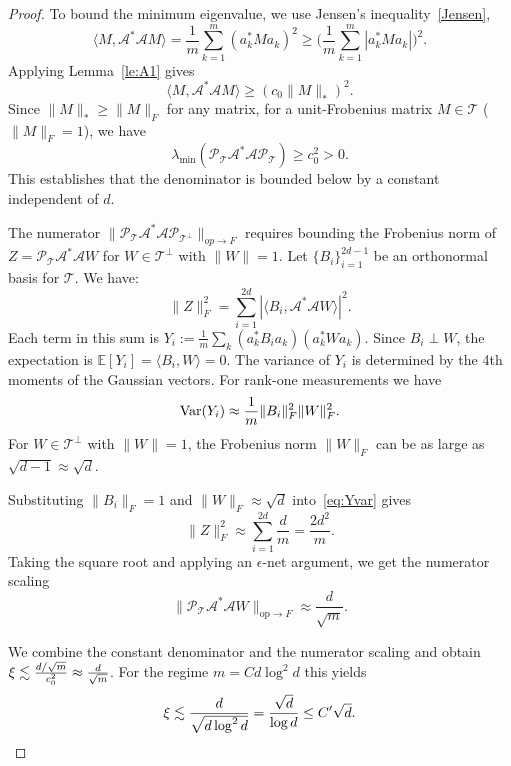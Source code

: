 \begin{proof}
To bound the minimum eigenvalue, we use Jensen's inequality~\eqref{Jensen},
$$\langle M, \mathcal{A}^* \mathcal{A} M \rangle = \frac{1}{m} \sum_{k=1}^m (a_k^* M a_k)^2 \ge \Big( \frac{1}{m} \sum_{k=1}^m |a_k^* M a_k| \Big)^2.$$
Applying Lemma~\ref{le:A1} gives
$$\langle M, \mathcal{A}^* \mathcal{A} M \rangle \ge (c_0 \|M\|_*)^2.$$
Since $\|M\|_* \ge \|M\|_F$ for any matrix, for a unit-Frobenius matrix $M \in \mathcal{T}$ ($\|M\|_F=1$), we have
$$\lambda_{\min}(\mathcal{P}_{\mathcal{T}} \mathcal{A}^* \mathcal{A} \mathcal{P}_{\mathcal{T}}) \ge c_0^2 > 0.$$
This establishes that the denominator is bounded below by a constant independent of $d$.


The numerator $\|\mathcal{P}_{\mathcal{T}} \mathcal{A}^* \mathcal{A} \mathcal{P}_{\mathcal{T}^\perp} \|_{op \to F}$ requires bounding the Frobenius norm of $Z = \mathcal{P}_{\mathcal{T}} \mathcal{A}^* \mathcal{A} W$ for $W \in \mathcal{T}^\perp$ with $\|W\|=1$.
Let $\{B_i\}_{i=1}^{2d-1}$ be an orthonormal basis for $\mathcal{T}$. We have:
$$\|Z\|_F^2 = \sum_{i=1}^{2d} |\langle B_i, \mathcal{A}^* \mathcal{A} W \rangle|^2.$$
Each term in this sum is $Y_i := \frac{1}{m} \sum_k (a_k^* B_i a_k)(a_k^* W a_k)$. Since $B_i \perp W$, the expectation is $\mathbb{E}[Y_i] = \langle B_i, W \rangle = 0$.
The variance of $Y_i$ is determined by the 4th moments of the Gaussian vectors. For rank-one measurements we have
\begin{equation}\label{eq:Yvar}
\operatorname{Var}(Y_i) \approx \frac{1}{m} \|B_i\|_F^2 \|W\|_F^2.
\end{equation}
For $W \in \mathcal{T}^\perp$ with $\|W\|=1$, the Frobenius norm $\|W\|_F$ can be as large as $\sqrt{d-1} \approx \sqrt{d}$.

Substituting $\|B_i\|_F=1$ and $\|W\|_F \approx \sqrt{d}$ into~\eqref{eq:Yvar} gives
$$\|Z\|_F^2 \approx \sum_{i=1}^{2d} \frac{d}{m} = \frac{2d^2}{m}.$$
Taking the square root and applying an $\epsilon$-net argument, we get the numerator scaling
$$\|\mathcal{P}_{\mathcal{T}} \mathcal{A}^* \mathcal{A} W\|_{\text{op}\to F} \approx \frac{d}{\sqrt{m}}.$$

We combine the constant denominator  and the numerator scaling and obtain
$\xi \lesssim \frac{d / \sqrt{m}}{c_0^2} \approx \frac{d}{\sqrt{m}}$. For the regime $m = C d \log^2 d$ this yields 
$$\xi \lesssim \frac{d}{\sqrt{d \log^2 d}} = \frac{\sqrt{d}}{\log d} \le C' \sqrt{d}.$$
    
\end{proof}


